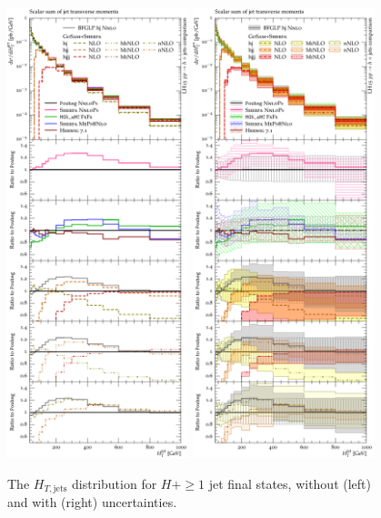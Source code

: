 \begin{figure}[t!]
  \centering
  \includegraphics[width=0.47\textwidth]{figures/hjetscomp_u_HT_jets.pdf}
  \hfill
  \includegraphics[width=0.47\textwidth]{figures/hjetscomp_HT_jets.pdf}
  \caption{
    The $H_{T,\mathrm{jets}}$ distribution for $H+\ge1$ jet final
    states, without (left) and with (right) uncertainties.
    \label{fig:hjetscomp:results:mobs:HT_jets}
  }
\end{figure}

